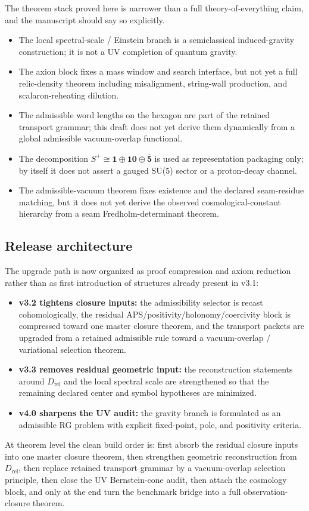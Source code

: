 \documentclass[11pt,a4paper]{article}
\theoremstyle{definition}
\theoremstyle{remark}
\begin{document}
The theorem stack proved here is narrower than a full theory-of-everything claim, and the manuscript should say so explicitly.
\begin{itemize}[leftmargin=1.5em, topsep=3pt, itemsep=2pt]
    \item The local spectral-scale / Einstein branch is a semiclassical induced-gravity construction; it is not a UV completion of quantum gravity.
    \item The axion block fixes a mass window and search interface, but not yet a full relic-density theorem including misalignment, string-wall production, and scalaron-reheating dilution.
    \item The admissible word lengths on the hexagon are part of the retained transport grammar; this draft does not yet derive them dynamically from a global admissible vacuum-overlap functional.
    \item The decomposition $S^+\cong \mathbf 1\oplus \mathbf{10}\oplus \overline{\mathbf 5}$ is used as representation packaging only; by itself it does not assert a gauged SU(5) sector or a proton-decay channel.
    \item The admissible-vacuum theorem fixes existence and the declared seam-residue matching, but it does not yet derive the observed cosmological-constant hierarchy from a seam Fredholm-determinant theorem.
\end{itemize}

\subsection{Release architecture}

The upgrade path is now organized as proof compression and axiom reduction rather
than as first introduction of structures already present in v3.1:
\begin{itemize}[leftmargin=1.5em, topsep=3pt, itemsep=2pt]
    \item \textbf{v3.2 tightens closure inputs:} the admissibility selector is recast cohomologically, the residual APS/positivity/holonomy/coercivity block is compressed toward one master closure theorem, and the transport packets are upgraded from a retained admissible rule toward a vacuum-overlap / variational selection theorem.
    \item \textbf{v3.3 removes residual geometric input:} the reconstruction statements around $D_{\mathrm{rel}}$ and the local spectral scale are strengthened so that the remaining declared center and symbol hypotheses are minimized.
    \item \textbf{v4.0 sharpens the UV audit:} the gravity branch is formulated as an admissible RG problem with explicit fixed-point, pole, and positivity criteria.
\end{itemize}
At theorem level the clean build order is: first absorb the residual closure inputs into
one master closure theorem, then strengthen geometric reconstruction from
$D_{\mathrm{rel}}$, then replace retained transport grammar by a vacuum-overlap
selection principle, then close the UV Bernstein-cone audit, then attach the
cosmology block, and only at the end turn the benchmark bridge into a full
observation-closure theorem.
\end{document}
